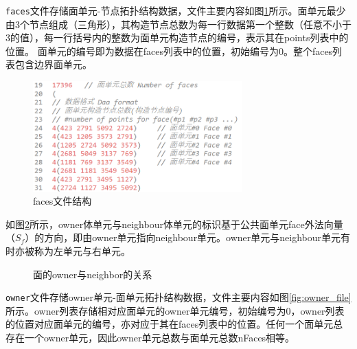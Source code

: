 \texttt{faces}文件存储面单元-节点拓扑结构数据，文件主要内容如图\ref{fig:faces_file}所示。面单元最少由3个节点组成（三角形），其构造节点总数为每一行数据第一个整数（任意不小于3的值），每一行括号内的整数为面单元构造节点的编号，表示其在points列表中的位置。
面单元的编号即为数据在faces列表中的位置，初始编号为0。整个faces列表包含边界面单元。

\begin{figure}[htp]
	\centering
	\includegraphics[width=0.72\textwidth]{./figures/faces.png}
	\caption{faces文件结构}
	\label{fig:faces_file}	
\end{figure}

如图\ref{fig:owner_neighbor}所示，owner体单元与neighbour体单元的标识基于公共面单元face外法向量（$S_f$）的方向，即由owner单元指向neighbour单元。owner单元与neighbour单元有时亦被称为左单元与右单元。


\begin{figure}[htb]
	\centering
	 \qquad
	\caption{面的owner与neighbor的关系}
	\label{fig:owner_neighbor}
\end{figure}

\texttt{owner}文件存储owner单元-面单元拓扑结构数据，文件主要内容如图\ref{fig:owner_file}所示。owner列表存储相对应面单元的owner单元编号，初始编号为0，owner列表的位置对应面单元的编号，亦对应于其在faces列表中的位置。任何一个面单元总存在一个owner单元，因此owner单元总数与面单元总数nFaces相等。

